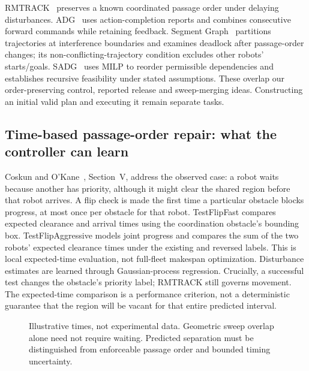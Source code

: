 \documentclass[11pt,a4paper]{article}
\theoremstyle{remark}
\begin{document}
RMTRACK~\cite{cap2016} preserves a known coordinated passage order under
delaying disturbances. ADG~\cite{hoenig2019} uses action-completion reports
and combines consecutive forward commands while retaining feedback.
Segment Graph~\cite{coskun2021} partitions trajectories at interference
boundaries and examines deadlock after passage-order changes; its
non-conflicting-trajectory condition excludes other robots' starts/goals.
SADG~\cite{berndt2024} uses MILP to reorder permissible dependencies and
establishes recursive feasibility under stated assumptions. These overlap
our order-preserving control, reported release and sweep-merging ideas.
Constructing an initial valid plan and executing it remain separate tasks.

\subsection{Time-based passage-order repair: what the controller can learn}
\label{sec:time-repair-review}
Coskun and O'Kane~\cite{coskun2019}, Section~V, address the observed case:
a robot waits because another has priority, although it might clear the
shared region before that robot arrives. A flip check is made the first
time a particular obstacle blocks progress, at most once per obstacle for
that robot. TestFlipFast compares expected clearance and arrival times
using the coordination obstacle's bounding box. TestFlipAggressive models
joint progress and compares the sum of the two robots' expected clearance
times under the existing and reversed labels. This is local expected-time
evaluation, not full-fleet makespan optimization. Disturbance estimates
are learned through Gaussian-process regression. Crucially, a successful
test changes the obstacle's priority label; RMTRACK still governs movement.
The expected-time comparison is a performance criterion, not a deterministic
guarantee that the region will be vacant for that entire predicted interval.

\begin{figure}[htbp]
\centering
{}
\caption{Illustrative times, not experimental data. Geometric sweep overlap
alone need not require waiting. Predicted separation must be distinguished
from enforceable passage order and bounded timing uncertainty.}
\label{fig:timed-separation}
\end{figure}
\end{document}
